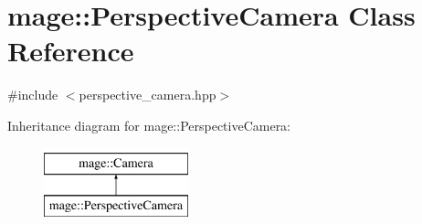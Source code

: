 \hypertarget{classmage_1_1_perspective_camera}{}\section{mage\+:\+:Perspective\+Camera Class Reference}
\label{classmage_1_1_perspective_camera}


{\ttfamily \#include $<$perspective\+\_\+camera.\+hpp$>$}

Inheritance diagram for mage\+:\+:Perspective\+Camera\+:\begin{figure}[H]
\begin{center}
\leavevmode
\includegraphics[height=2.000000cm]{classmage_1_1_perspective_camera}
\end{center}
\end{figure}
